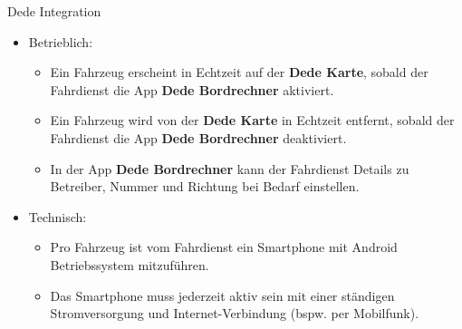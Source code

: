 
\begin{frame}{Dede Integration}
  \begin{itemize}
  \item Betrieblich:
    \begin{itemize}
    \item Ein Fahrzeug erscheint in Echtzeit auf der \textbf{Dede Karte}, sobald der Fahrdienst die App \textbf{Dede Bordrechner} aktiviert.
    \item Ein Fahrzeug wird von der \textbf{Dede Karte} in Echtzeit entfernt, sobald der Fahrdienst die App \textbf{Dede Bordrechner} deaktiviert.
      \item In der App \textbf{Dede Bordrechner} kann der Fahrdienst Details zu Betreiber, Nummer und Richtung bei Bedarf einstellen.
    \end{itemize}
  \item Technisch:
    \begin{itemize}
    \item Pro Fahrzeug ist vom Fahrdienst ein Smartphone mit Android Betriebssystem mitzuführen.
    \item Das Smartphone muss jederzeit aktiv sein mit einer ständigen Stromversorgung und Internet-Verbindung (bspw. per Mobilfunk).
    \end{itemize}
  \end{itemize}
\end{frame}
